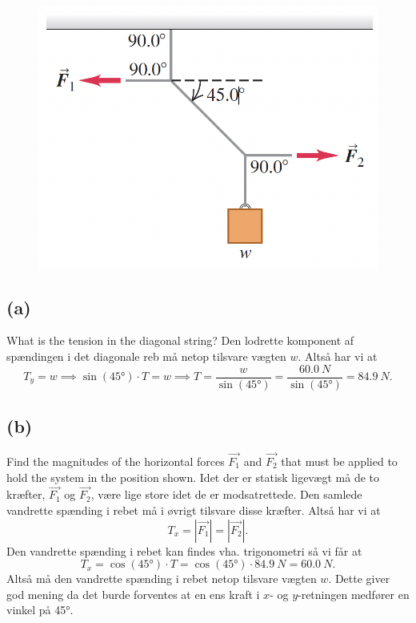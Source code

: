 \documentclass[12pt]{article}
\begin{document}
\begin{figure} [ht]
  \centering
  \caption{}
  \includegraphics[width=0.5\linewidth]{../figures/E5_8.png}
  \label{fig:E5_8}
\end{figure}

\subsection*{(a)}
What is the tension in the diagonal string?
\bigbreak
Den lodrette komponent af spændingen i det diagonale reb må netop tilsvare vægten $w$. Altså har vi at
 \[
T_y = w \implies \sin(\ang{45})\cdot T = w \implies T = \frac{w}{\sin(\ang{45})} = \frac{\qty{60,0}{N}}{\sin(\ang{45})} = \qty{84,9}{N}
.\] 

\subsection*{(b)}
Find the magnitudes of the horizontal forces $\Vec{F_1}$ and $\Vec{F_2}$ that must be applied to hold the system in the position shown.
\bigbreak
Idet der er statisk ligevægt må de to kræfter, $\Vec{F_1}$ og $\Vec{F_2}$, være lige store idet de er modsatrettede. Den samlede vandrette spænding i rebet må i øvrigt tilsvare disse kræfter. Altså har vi at
\[
T_x = |\Vec{F_1}| = |\Vec{F_2}|
.\] 
Den vandrette spænding i rebet kan findes vha. trigonometri så vi får at
\[
T_x = \cos(\ang{45})\cdot T = \cos(\ang{45})\cdot \qty{84,9}{N} = \qty{60,0}{N} 
.\] 
Altså må den vandrette spænding i rebet netop tilsvare vægten  $w$. Dette giver god mening da det burde forventes at en ens kraft i  $x$- og  $y$-retningen medfører en vinkel på  \ang{45}.
\end{document}
